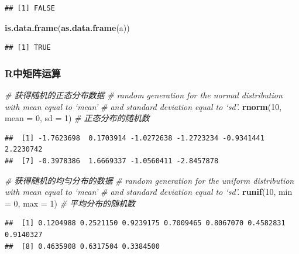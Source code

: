 \documentclass[]{article}
\newenvironment{Shaded}{\begin{snugshade}}{\end{snugshade}}
\newcommand{\KeywordTok}[1]{\textcolor[rgb]{0.13,0.29,0.53}{\textbf{{#1}}}}
\newcommand{\DataTypeTok}[1]{\textcolor[rgb]{0.13,0.29,0.53}{{#1}}}
\newcommand{\DecValTok}[1]{\textcolor[rgb]{0.00,0.00,0.81}{{#1}}}
\newcommand{\CommentTok}[1]{\textcolor[rgb]{0.56,0.35,0.01}{\textit{{#1}}}}
\newcommand{\NormalTok}[1]{{#1}}
\numberwithin{figure}{section}
\numberwithin{table}{section}
\theoremstyle{definition}
\theoremstyle{definition}
\theoremstyle{definition}
\theoremstyle{remark}
\begin{document}
\begin{verbatim}
## [1] FALSE
\end{verbatim}

\begin{Shaded}
\begin{Highlighting}[]
\KeywordTok{is.data.frame}\NormalTok{(}\KeywordTok{as.data.frame}\NormalTok{(a))}
\end{Highlighting}
\end{Shaded}

\begin{verbatim}
## [1] TRUE
\end{verbatim}

\subsubsection{R中矩阵运算}\label{r}

\begin{Shaded}
\begin{Highlighting}[]
\CommentTok{# 获得随机的正态分布数据}
\CommentTok{# random generation for the normal distribution with mean equal to ‘mean’}
\CommentTok{# and standard deviation equal to ‘sd’.}
\KeywordTok{rnorm}\NormalTok{(}\DecValTok{10}\NormalTok{, }\DataTypeTok{mean =} \DecValTok{0}\NormalTok{, }\DataTypeTok{sd =} \DecValTok{1}\NormalTok{) }\CommentTok{# 正态分布的随机数}
\end{Highlighting}
\end{Shaded}

\begin{verbatim}
##  [1] -1.7623698  0.1703914 -1.0272638 -1.2723234 -0.9341441  2.2230742
##  [7] -0.3978386  1.6669337 -1.0560411 -2.8457878
\end{verbatim}

\begin{Shaded}
\begin{Highlighting}[]
\CommentTok{# 获得随机的均匀分布的数据}
\CommentTok{# random generation for the uniform distribution with mean equal to ‘mean’}
\CommentTok{# and standard deviation equal to ‘sd’.}
\KeywordTok{runif}\NormalTok{(}\DecValTok{10}\NormalTok{, }\DataTypeTok{min =} \DecValTok{0}\NormalTok{, }\DataTypeTok{max =} \DecValTok{1}\NormalTok{) }\CommentTok{# 平均分布的随机数}
\end{Highlighting}
\end{Shaded}

\begin{verbatim}
##  [1] 0.1204988 0.2521150 0.9239175 0.7009465 0.8067070 0.4582831 0.9140327
##  [8] 0.4635908 0.6317504 0.3384500
\end{verbatim}
\end{document}
